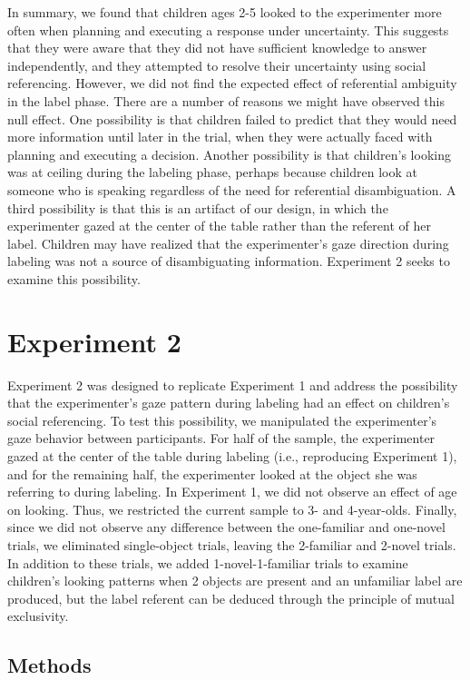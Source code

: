 \documentclass[10pt, letterpaper]{article}
\begin{document}
In summary, we found that children ages 2-5 looked to the experimenter
more often when planning and executing a response under uncertainty.
This suggests that they were aware that they did not have sufficient
knowledge to answer independently, and they attempted to resolve their
uncertainty using social referencing. However, we did not find the
expected effect of referential ambiguity in the label phase. There are a
number of reasons we might have observed this null effect. One
possibility is that children failed to predict that they would need more
information until later in the trial, when they were actually faced with
planning and executing a decision. Another possibility is that
children's looking was at ceiling during the labeling phase, perhaps
because children look at someone who is speaking regardless of the need
for referential disambiguation. A third possibility is that this is an
artifact of our design, in which the experimenter gazed at the center of
the table rather than the referent of her label. Children may have
realized that the experimenter's gaze direction during labeling was not
a source of disambiguating information. Experiment 2 seeks to examine
this possibility.

\section{Experiment 2}\label{experiment-2}

Experiment 2 was designed to replicate Experiment 1 and address the
possibility that the experimenter's gaze pattern during labeling had an
effect on children's social referencing. To test this possibility, we
manipulated the experimenter's gaze behavior between participants. For
half of the sample, the experimenter gazed at the center of the table
during labeling (i.e., reproducing Experiment 1), and for the remaining
half, the experimenter looked at the object she was referring to during
labeling. In Experiment 1, we did not observe an effect of age on
looking. Thus, we restricted the current sample to 3- and 4-year-olds.
Finally, since we did not observe any difference between the
one-familiar and one-novel trials, we eliminated single-object trials,
leaving the 2-familiar and 2-novel trials. In addition to these trials,
we added 1-novel-1-familiar trials to examine children's looking
patterns when 2 objects are present and an unfamiliar label are
produced, but the label referent can be deduced through the principle of
mutual exclusivity.

\subsection{Methods}\label{methods-1}
\end{document}

